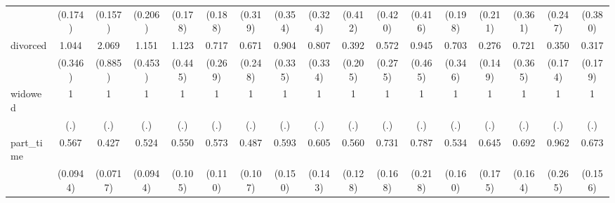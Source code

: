 {\begin{tabular}{l*{16}{c}}
                    &     (0.174)         &     (0.157)         &     (0.206)         &     (0.178)         &     (0.188)         &     (0.319)         &     (0.354)         &     (0.324)         &     (0.412)         &     (0.420)         &     (0.416)         &     (0.198)         &     (0.211)         &     (0.361)         &     (0.247)         &     (0.380)         \\
[1em]
divorced            &       1.044         &       2.069         &       1.151         &       1.123         &       0.717         &       0.671         &       0.904         &       0.807         &       0.392         &       0.572         &       0.945         &       0.703         &       0.276\sym{*}  &       0.721         &       0.350\sym{*}  &       0.317\sym{*}  \\
                    &     (0.346)         &     (0.885)         &     (0.453)         &     (0.445)         &     (0.269)         &     (0.248)         &     (0.335)         &     (0.334)         &     (0.205)         &     (0.275)         &     (0.465)         &     (0.346)         &     (0.149)         &     (0.365)         &     (0.174)         &     (0.179)         \\
[1em]
widowed             &           1         &           1         &           1         &           1         &           1         &           1         &           1         &           1         &           1         &           1         &           1         &           1         &           1         &           1         &           1         &           1         \\
                    &         (.)         &         (.)         &         (.)         &         (.)         &         (.)         &         (.)         &         (.)         &         (.)         &         (.)         &         (.)         &         (.)         &         (.)         &         (.)         &         (.)         &         (.)         &         (.)         \\
[1em]
part\_time           &       0.567\sym{***}&       0.427\sym{***}&       0.524\sym{***}&       0.550\sym{**} &       0.573\sym{**} &       0.487\sym{**} &       0.593\sym{*}  &       0.605\sym{*}  &       0.560\sym{*}  &       0.731         &       0.787         &       0.534\sym{*}  &       0.645         &       0.692         &       0.962         &       0.673         \\
                    &    (0.0944)         &    (0.0717)         &    (0.0944)         &     (0.105)         &     (0.110)         &     (0.107)         &     (0.150)         &     (0.143)         &     (0.128)         &     (0.168)         &     (0.218)         &     (0.160)         &     (0.175)         &     (0.164)         &     (0.265)         &     (0.156)         \\

\end{tabular}}
